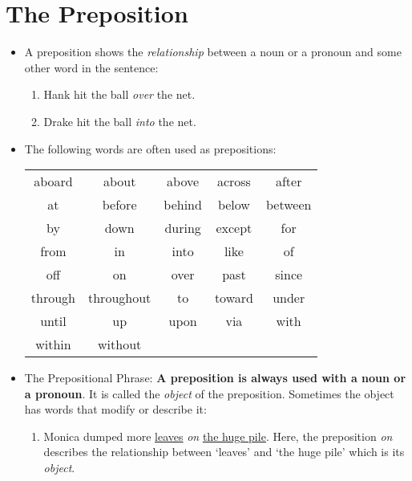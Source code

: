 \documentclass[12pt]{article}         %
\begin{document}
\section{The Preposition}
\label{sec: preposition}
\begin{itemize}
    \item A preposition shows the \textit{relationship} between a noun or a pronoun and some other word in the sentence:
        \begin{enumerate}
            \item Hank hit the ball \textit{over} the net.
            \item Drake hit the ball \textit{into} the net.
        \end{enumerate}
    \item The following words are often used as prepositions:
        \begin{center}
        \begin{tabular}{ c c c c c }
            aboard & about & above & across & after \\
            at & before & behind & below & between \\
            by & down & during & except & for \\
            from & in & into & like & of \\
            off & on & over & past & since \\
            through & throughout & to & toward & under \\
            until & up & upon & via & with \\
            within & without 
        \end{tabular}
        \end{center}
    \item The Prepositional Phrase: \textbf{A preposition is always used with a noun or a pronoun}. It is called the \textit{object} of the preposition. Sometimes the object has words that modify or describe it:
        \begin{enumerate}
            \item Monica dumped more \underline{leaves} \textit{on} \underline{the huge pile}. Here, the preposition \textit{on} describes the relationship between `leaves' and `the huge pile' which is its \textit{object}.
        \end{enumerate}
\end{itemize}
\end{document}
